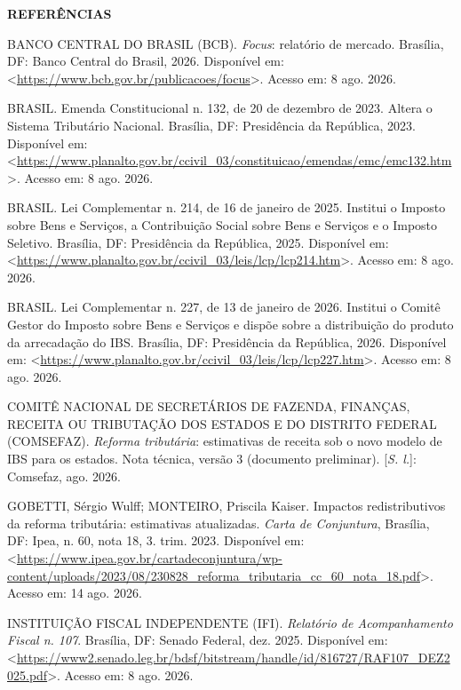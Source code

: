 \documentclass[12pt,a4paper]{article}
\newcommand{\tituloscentral}[1]{\par\vspace{18pt}\begin{center}\bfseries\MakeUppercase{#1}\end{center}\vspace{6pt}\nopagebreak}
\begin{document}
\tituloscentral{Referências}
\vspace{-6pt}
\begingroup
\singlespacing\raggedright\setlength{\parindent}{0pt}\setlength{\parskip}{12pt}

BANCO CENTRAL DO BRASIL (BCB). \textit{Focus}: relatório de mercado. Brasília, DF: Banco Central do Brasil, 2026. Disponível em: <\url{https://www.bcb.gov.br/publicacoes/focus}>. Acesso em: 8 ago. 2026.

BRASIL. Emenda Constitucional n. 132, de 20 de dezembro de 2023. Altera o Sistema Tributário Nacional. Brasília, DF: Presidência da República, 2023. Disponível em: <\url{https://www.planalto.gov.br/ccivil_03/constituicao/emendas/emc/emc132.htm}>. Acesso em: 8 ago. 2026.

BRASIL. Lei Complementar n. 214, de 16 de janeiro de 2025. Institui o Imposto sobre Bens e Serviços, a Contribuição Social sobre Bens e Serviços e o Imposto Seletivo. Brasília, DF: Presidência da República, 2025. Disponível em: <\url{https://www.planalto.gov.br/ccivil_03/leis/lcp/lcp214.htm}>. Acesso em: 8 ago. 2026.

BRASIL. Lei Complementar n. 227, de 13 de janeiro de 2026. Institui o Comitê Gestor do Imposto sobre Bens e Serviços e dispõe sobre a distribuição do produto da arrecadação do IBS. Brasília, DF: Presidência da República, 2026. Disponível em: <\url{https://www.planalto.gov.br/ccivil_03/leis/lcp/lcp227.htm}>. Acesso em: 8 ago. 2026.

COMITÊ NACIONAL DE SECRETÁRIOS DE FAZENDA, FINANÇAS, RECEITA OU TRIBUTAÇÃO DOS ESTADOS E DO DISTRITO FEDERAL (COMSEFAZ). \textit{Reforma tributária}: estimativas de receita sob o novo modelo de IBS para os estados. Nota técnica, versão 3 (documento preliminar). [\textit{S. l.}]: Comsefaz, ago. 2026.

GOBETTI, Sérgio Wulff; MONTEIRO, Priscila Kaiser. Impactos redistributivos da reforma tributária: estimativas atualizadas. \textit{Carta de Conjuntura}, Brasília, DF: Ipea, n. 60, nota 18, 3. trim. 2023. Disponível em: <\url{https://www.ipea.gov.br/cartadeconjuntura/wp-content/uploads/2023/08/230828_reforma_tributaria_cc_60_nota_18.pdf}>. Acesso em: 14 ago. 2026.

INSTITUIÇÃO FISCAL INDEPENDENTE (IFI). \textit{Relatório de Acompanhamento Fiscal n. 107}. Brasília, DF: Senado Federal, dez. 2025. Disponível em: <\url{https://www2.senado.leg.br/bdsf/bitstream/handle/id/816727/RAF107_DEZ2025.pdf}>. Acesso em: 8 ago. 2026.
\end{document}
